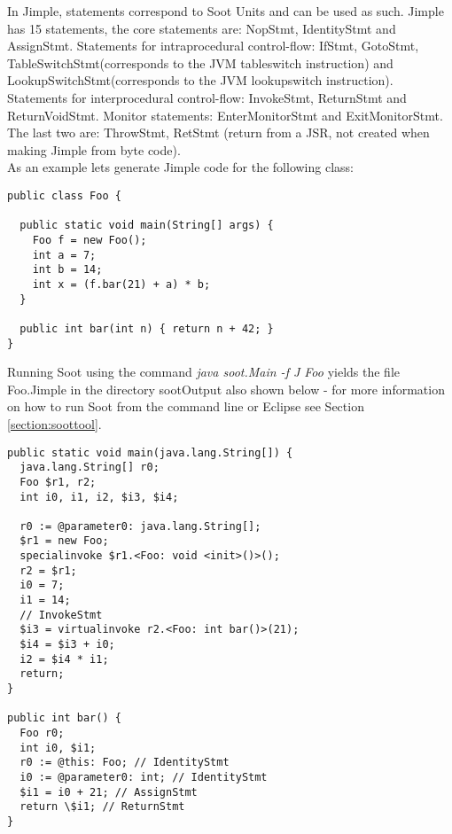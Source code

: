 \documentclass{article}
\begin{document}
In Jimple, statements correspond to Soot Units and can be used as
such.  Jimple has 15 statements, the core statements are: NopStmt,
IdentityStmt and AssignStmt. Statements for intraprocedural
control-flow: IfStmt, GotoStmt, TableSwitchStmt(corresponds to the JVM
tableswitch instruction) and LookupSwitchStmt(corresponds to the JVM
lookupswitch instruction). Statements for interprocedural
control-flow: InvokeStmt, ReturnStmt and ReturnVoidStmt. Monitor
statements: EnterMonitorStmt and ExitMonitorStmt. The last two are:
ThrowStmt, RetStmt (return from a JSR, not created when making Jimple
from byte code).\\

As an example lets generate Jimple code for the following class:

\begin{center}
  \begin{minipage}{0.7 \linewidth}
    \begin{verbatim}
public class Foo {

  public static void main(String[] args) {
    Foo f = new Foo();
    int a = 7;
    int b = 14;
    int x = (f.bar(21) + a) * b;
  }

  public int bar(int n) { return n + 42; }
}
    \end{verbatim}
  \end{minipage}
\end{center}

Running Soot using the command \textit{java soot.Main -f J Foo} yields
the file Foo.Jimple in the directory sootOutput also shown below - for
more information on how to run Soot from the command line or Eclipse
see Section \ref{section:soottool}.

\begin{center}
  \begin{minipage}{0.7 \linewidth}
    \begin{verbatim}
public static void main(java.lang.String[]) {
  java.lang.String[] r0;
  Foo $r1, r2;
  int i0, i1, i2, $i3, $i4;

  r0 := @parameter0: java.lang.String[];
  $r1 = new Foo;
  specialinvoke $r1.<Foo: void <init>()>();
  r2 = $r1;
  i0 = 7;
  i1 = 14;
  // InvokeStmt
  $i3 = virtualinvoke r2.<Foo: int bar()>(21);
  $i4 = $i3 + i0;
  i2 = $i4 * i1;
  return;
}

public int bar() {
  Foo r0; 
  int i0, $i1;
  r0 := @this: Foo; // IdentityStmt
  i0 := @parameter0: int; // IdentityStmt
  $i1 = i0 + 21; // AssignStmt
  return \$i1; // ReturnStmt
}
    \end{verbatim}
  \end{minipage}
\end{center}
\end{document}
